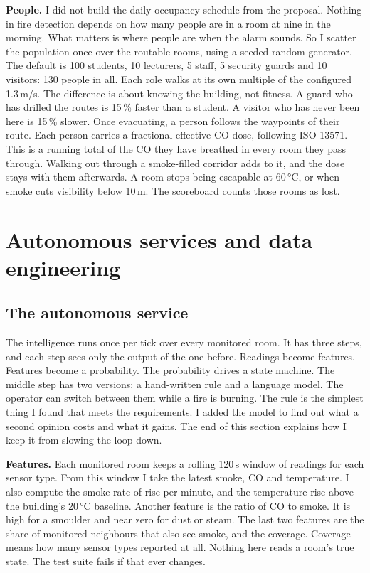 \textbf{People.} I did not build the daily occupancy schedule from the proposal.
Nothing in fire detection depends on how many people are in a room at nine in the
morning. What matters is where people are when the alarm sounds. So I scatter the
population once over the routable rooms, using a seeded random generator. The
default is 100 students, 10 lecturers, 5 staff, 5 security guards and 10 visitors:
130 people in all. Each role walks at its own multiple of the configured 1.3\,m/s.
The difference is about knowing the building, not fitness. A guard who has drilled
the routes is 15\,\% faster than a student. A visitor who has never been here is
15\,\% slower. Once evacuating, a person follows the waypoints of their route. Each
person carries a fractional effective CO dose, following ISO 13571. This is a
running total of the CO they have breathed in every room they pass through.
Walking out through a smoke-filled corridor adds to it, and the dose stays with
them afterwards. A room stops being escapable at 60\,°C, or when smoke cuts
visibility below 10\,m. The scoreboard counts those rooms as lost.

\section{Autonomous services and data engineering}\label{sec:services}

\subsection{The autonomous service}\label{sec:service}

The intelligence runs once per tick over every monitored room. It has three steps,
and each step sees only the output of the one before. Readings become features.
Features become a probability. The probability drives a state machine. The middle
step has two versions: a hand-written rule and a language model. The operator can
switch between them while a fire is burning. The rule is the simplest thing I found
that meets the requirements. I added the model to find out what a second opinion
costs and what it gains. The end of this section explains how I keep it from
slowing the loop down.

\textbf{Features.} Each monitored room keeps a rolling 120\,s window of readings
for each sensor type. From this window I take the latest smoke, CO and temperature.
I also compute the smoke rate of rise per minute, and the temperature rise above
the building's 20\,°C baseline. Another feature is the ratio of CO to smoke. It is
high for a smoulder and near zero for dust or steam. The last two features are the
share of monitored neighbours that also see smoke, and the coverage. Coverage means
how many sensor types reported at all. Nothing here reads a room's true state. The
test suite fails if that ever changes.

